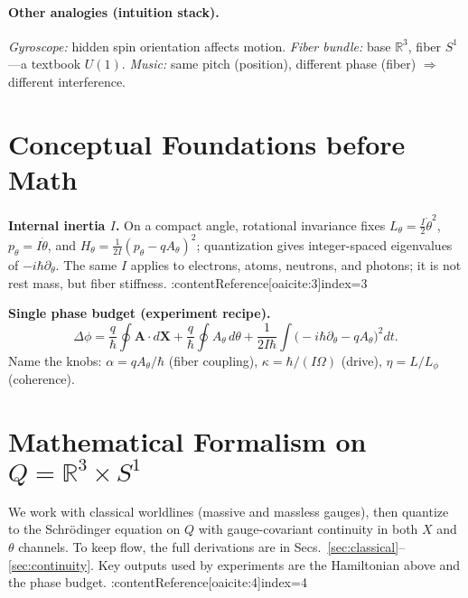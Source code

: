 \paragraph{Other analogies (intuition stack).}
\emph{Gyroscope:} hidden spin orientation affects motion.
\emph{Fiber bundle:} base $\mathbb{R}^3$, fiber $S^1$—a textbook $U(1)$.
\emph{Music:} same pitch (position), different phase (fiber) $\Rightarrow$ different interference.

\section{\texorpdfstring{Conceptual Foundations before Math}{Conceptual Foundations before Math}}
\label{sec:conceptual}
\textbf{Internal inertia $I$.} On a compact angle, rotational invariance fixes $L_\theta=\tfrac{I}{2}\dot\theta^2$,
$p_\theta=I\dot\theta$, and $H_\theta=\tfrac{1}{2I}(p_\theta-qA_\theta)^2$; quantization gives integer-spaced
eigenvalues of $-i\hbar\partial_\theta$. The same $I$ applies to electrons, atoms, neutrons, and photons;
it is not rest mass, but fiber stiffness. :contentReference[oaicite:3]{index=3}

\textbf{Single phase budget (experiment recipe).}
\[
\Delta\phi
= \frac{q}{\hbar}\oint \mathbf{A}\!\cdot d\mathbf{X}
+ \frac{q}{\hbar}\oint A_\theta\,d\theta
+ \frac{1}{2I\hbar}\int\!\bigl(-i\hbar\partial_\theta-qA_\theta\bigr)^2 dt.
\]
Name the knobs: $\alpha=qA_\theta/\hbar$ (fiber coupling), $\kappa=\hbar/(I\Omega)$ (drive), $\eta=L/L_\phi$ (coherence).

\section{\texorpdfstring{Mathematical Formalism on $Q=\mathbb{R}^3\times S^1$}{Mathematical Formalism on Q}}
\label{sec:math}
We work with classical worldlines (massive and massless gauges), then quantize to the
Schrödinger equation on $Q$ with gauge-covariant continuity in both $X$ and $\theta$ channels.
To keep flow, the full derivations are in Secs.~\ref{sec:classical}--\ref{sec:continuity}.
Key outputs used by experiments are the Hamiltonian above and the phase budget. :contentReference[oaicite:4]{index=4}

